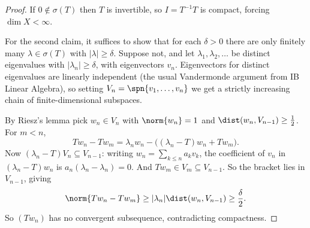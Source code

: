 \begin{proof}
	If $0\notin\sigma(T)$ then $T$ is invertible, so $I = T^{-1}T$ is compact, forcing $\dim X<\infty$.

	For the second claim, it suffices to show that for each $\delta>0$ there are only finitely many $\lambda\in\sigma(T)$ with $|\lambda|\geq\delta$. Suppose not, and let $\lambda_1,\lambda_2,\dots$ be distinct eigenvalues with $|\lambda_n|\geq\delta$, with eigenvectors $v_n$. Eigenvectors for distinct eigenvalues are linearly independent (the usual Vandermonde argument from IB Linear Algebra), so setting $V_n = \spn\{v_1,\dots,v_n\}$ we get a strictly increasing chain of finite-dimensional subspaces.

	By Riesz's lemma pick $w_n \in V_n$ with $\norm{w_n}=1$ and $\dist(w_n,V_{n-1})\geq\frac12$. For $m<n$,
	$$Tw_n - Tw_m = \lambda_n w_n - \big( (\lambda_n - T)w_n + Tw_m \big).$$
	Now $(\lambda_n - T)V_n\subseteq V_{n-1}$: writing $w_n = \sum_{k\leq n}a_kv_k$, the coefficient of $v_n$ in $(\lambda_n-T)w_n$ is $a_n(\lambda_n-\lambda_n)=0$. And $Tw_m\in V_m\subseteq V_{n-1}$. So the bracket lies in $V_{n-1}$, giving
	$$\norm{Tw_n - Tw_m}\geq|\lambda_n|\dist(w_n,V_{n-1})\geq\frac{\delta}{2}.$$
	So $(Tw_n)$ has no convergent subsequence, contradicting compactness.
\end{proof}

\begin{center}
\end{center}

